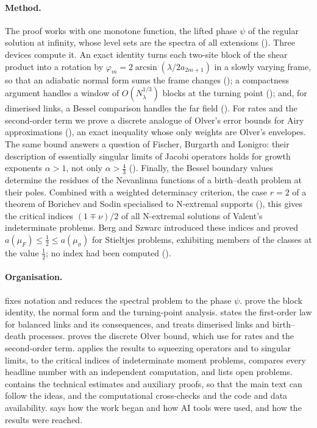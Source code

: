 \paragraph{Method.} The proof works with one monotone function, the lifted phase $\psi$ of
the regular solution at infinity, whose level sets are the spectra of all extensions
(). Three devices compute it. An exact identity turns each two-site block
of the shear product into a rotation by $\varphi_m=2\arcsin(\lambda/2a_{2m+1})$ in a slowly
varying frame, so that an adiabatic normal form sums the frame changes ();
a compactness argument handles a window of $O(N_\lambda^{1/3})$ blocks at the turning point
(); and, for dimerised links, a Bessel comparison handles the far field
(). For rates and the second-order term we prove a discrete analogue of
Olver's error bounds for Airy approximations (), an exact inequality whose only weights
are Olver's envelopes. The same bound answers a question of Fischer, Burgarth and Lonigro: their
description of essentially singular limits of Jacobi operators holds for growth exponents $\alpha>1$,
not only $\alpha>\frac43$ (). Finally, the Bessel boundary values determine the residues
of the Nevanlinna functions of a birth--death problem at their poles. Combined with a weighted
determinacy criterion, the case $r=2$ of a theorem of Borichev and Sodin specialised to N-extremal
supports (), this gives the critical indices $(1\mp\nu)/2$ of all N-extremal
solutions of Valent's indeterminate problems. Berg and Szwarc introduced these indices and proved
$a(\mu_F)\le\frac12\le a(\mu_\sigma)$ for Stieltjes problems, exhibiting members of the classes at the
value $\frac12$; no index had been computed ().

\paragraph{Organisation.}  fixes notation and reduces the spectral problem
to the phase $\psi$.  prove the block identity, the normal form
and the turning-point analysis.  states the first-order law for balanced
links and its consequences, and  treats dimerised links and birth--death
processes.  proves the discrete Olver bound, which 
use for rates and the second-order term.  applies the results to squeezing
operators and to singular limits,  to the critical indices of indeterminate
moment problems,  compares every headline number with
an independent computation, and  lists open problems. 
contains the technical estimates and auxiliary proofs, so that the main text can follow the ideas,
and  the computational cross-checks and the code and data availability.
 says how the work began and how AI tools were used, and
 how the results were reached.
